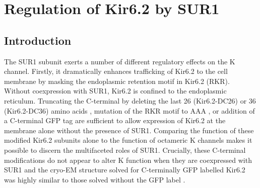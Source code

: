 \chapter{\label{ch:6}Regulation of Kir6.2 by SUR1} 

\graphicspath{{figures/tempfigs/}}

\minitoc

\section{Introduction}
The SUR1 subunit exerts a number of different regulatory effects on the K\ATP{} channel.
Firstly, it dramatically enhances trafficking of Kir6.2 to the cell membrane by masking the endoplasmic retention motif in Kir6.2 (RKR).
Without coexpression with SUR1, Kir6.2 is confined to the endoplasmic reticulum.
Truncating the C-terminal by deleting the last 26 (Kir6.2-\textgreek{D}C26) or 36 (Kir6.2-\textgreek{D}C36) amino acids \cite{tucker_truncation_1997}, mutation of the RKR motif to AAA \cite{zerangue_new_1999}, or addition of a C-terminal GFP tag \cite{john_sulphonylurea_1998} are sufficient to allow expression of Kir6.2 at the membrane alone without the presence of SUR1.
Comparing the function of these modified Kir6.2 subunits alone to the function of octameric K\ATP{} channels makes it possible to discern the multifaceted roles of SUR1.
Crucially, these C-terminal modifications do not appear to alter K\ATP{} function when they are coexpressed with SUR1 \cite{tucker_truncation_1997, john_sulphonylurea_1998, ribalet_atp-sensitive_2006} and the cryo-EM structure solved for C-terminally GFP labelled Kir6.2 \cite{li_structure_2017} was highly similar to those solved without the GFP label \cite{martin_anti-diabetic_2017-1, lee_molecular_2017-1}.

